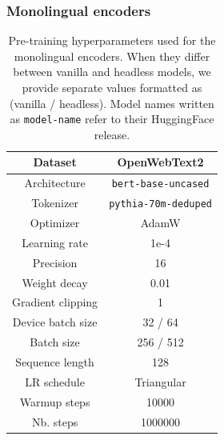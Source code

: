 \subsubsection{Monolingual encoders}
\label{app:train_mono_enc}
\begin{table}[H]
\centering
\small
\begin{tabular}{c|c}
\toprule
Dataset & OpenWebText2  \\ \hline
Architecture & \texttt{bert-base-uncased} \\ \hline
Tokenizer & \texttt{pythia-70m-deduped} \\ \hline
Optimizer         & AdamW      \\ \hline
Learning rate     & 1e-4       \\ \hline
Precision  & 16 \\ \hline
Weight decay      & 0.01       \\ \hline
Gradient clipping & 1          \\ \hline
Device batch size        & 32 / 64         \\ \hline
Batch size        & 256 / 512         \\ \hline
Sequence length   & 128        \\ \hline
LR schedule       & Triangular \\ \hline
Warmup steps      & 10000      \\ \hline
Nb. steps         & 1000000        \\ \bottomrule
\end{tabular}
\caption{Pre-training hyperparameters used for the monolingual encoders. When they differ between vanilla and headless models, we provide separate values formatted as (vanilla / headless). Model names written as \texttt{model-name} refer to their HuggingFace release.}
\end{table}

